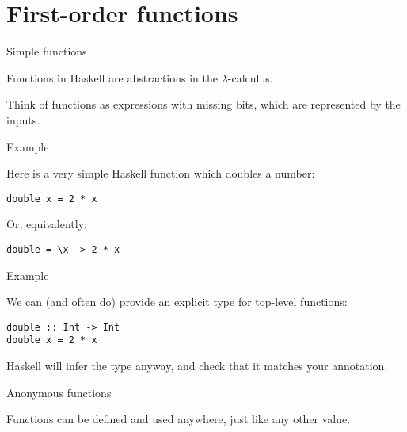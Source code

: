 
\section{First-order functions}

%
\begin{frame}[fragile]{Simple functions}

Functions in Haskell are abstractions in the $\lambda$-calculus. 

Think of functions as expressions with missing bits, which are represented by
the inputs.

\end{frame}


%
\begin{frame}[fragile]{Example}

Here is a very simple Haskell function which doubles a number:

\begin{block}{}
\begin{verbatim}
double x = 2 * x
\end{verbatim}
\end{block}

Or, equivalently:

\begin{block}{}
\begin{verbatim}
double = \x -> 2 * x
\end{verbatim}
\end{block}

\end{frame}

%
\begin{frame}[fragile]{Example}

We can (and often do) provide an explicit type for top-level functions:

\begin{verbatim}
double :: Int -> Int
double x = 2 * x
\end{verbatim}

Haskell will infer the type anyway, and check that it matches your annotation.

\end{frame}

%
\begin{frame}[fragile]{Anonymous functions}

Functions can be defined and used anywhere, just like any other value.

\end{frame}

